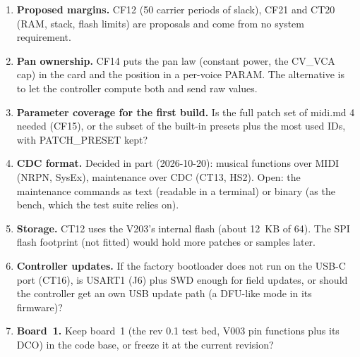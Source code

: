 \begin{enumerate}
  \item \textbf{Proposed margins.} CF12 (50 carrier periods of slack), CF21 and CT20 (RAM, stack, flash limits) are
    proposals and come from no system requirement.
  \item \textbf{Pan ownership.} CF14 puts the pan law (constant power, the CV\_VCA cap) in the card and the position
    in a per-voice PARAM. The alternative is to let the controller compute both and send raw values.
  \item \textbf{Parameter coverage for the first build.} Is the full patch set of midi.md 4 needed (CF15), or the
    subset of the built-in presets plus the most used IDs, with PATCH\_PRESET kept?
  \item \textbf{CDC format.} Decided in part (2026-10-20): musical functions over MIDI (NRPN, SysEx), maintenance
    over CDC (CT13, HS2). Open: the maintenance commands as text (readable in a terminal) or binary (as the bench,
    which the test suite relies on).
  \item \textbf{Storage.} CT12 uses the V203's internal flash (about \SI{12}{KB} of 64). The SPI flash footprint (not
    fitted) would hold more patches or samples later.
  \item \textbf{Controller updates.} If the factory bootloader does not run on the USB-C port (CT16), is USART1 (J6)
    plus SWD enough for field updates, or should the controller get an own USB update path (a DFU-like mode in its
    firmware)?
  \item \textbf{Board~1.} Keep board~1 (the rev 0.1 test bed, V003 pin functions plus its DCO) in the code base, or
    freeze it at the current revision?
\end{enumerate}
